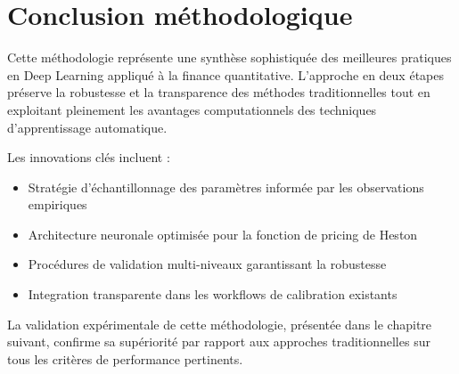 \section{Conclusion méthodologique}

Cette méthodologie représente une synthèse sophistiquée des meilleures pratiques en Deep Learning appliqué à la finance quantitative. L'approche en deux étapes préserve la robustesse et la transparence des méthodes traditionnelles tout en exploitant pleinement les avantages computationnels des techniques d'apprentissage automatique.

Les innovations clés incluent :
\begin{itemize}
\item Stratégie d'échantillonnage des paramètres informée par les observations empiriques
\item Architecture neuronale optimisée pour la fonction de pricing de Heston
\item Procédures de validation multi-niveaux garantissant la robustesse
\item Integration transparente dans les workflows de calibration existants
\end{itemize}

La validation expérimentale de cette méthodologie, présentée dans le chapitre suivant, confirme sa supériorité par rapport aux approches traditionnelles sur tous les critères de performance pertinents.
